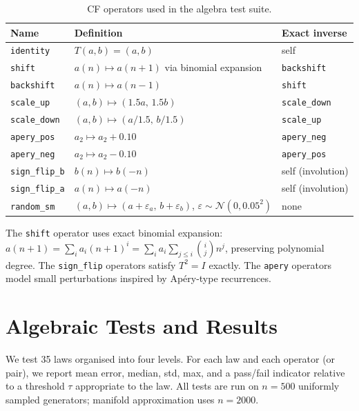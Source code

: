 \documentclass[11pt,a4paper]{article}
\begin{document}
\begin{table}[h]
\centering
\caption{CF operators used in the algebra test suite.}
\label{tab:operators}
\begin{tabular}{lll}
\toprule
Name & Definition & Exact inverse \\
\midrule
\texttt{identity}    & $T(a,b) = (a,b)$ & self \\
\texttt{shift}       & $a(n) \mapsto a(n+1)$ via binomial expansion & \texttt{backshift} \\
\texttt{backshift}   & $a(n) \mapsto a(n-1)$ & \texttt{shift} \\
\texttt{scale\_up}   & $(a,b) \mapsto (1.5a,\, 1.5b)$ & \texttt{scale\_down} \\
\texttt{scale\_down} & $(a,b) \mapsto (a/1.5,\, b/1.5)$ & \texttt{scale\_up} \\
\texttt{apery\_pos}  & $a_2 \mapsto a_2 + 0.10$ & \texttt{apery\_neg} \\
\texttt{apery\_neg}  & $a_2 \mapsto a_2 - 0.10$ & \texttt{apery\_pos} \\
\texttt{sign\_flip\_b} & $b(n) \mapsto b(-n)$ & self (involution) \\
\texttt{sign\_flip\_a} & $a(n) \mapsto a(-n)$ & self (involution) \\
\texttt{random\_sm}  & $(a,b) \mapsto (a + \varepsilon_a,\, b + \varepsilon_b)$,
                       $\varepsilon \sim \mathcal{N}(0, 0.05^2)$ & none \\
\bottomrule
\end{tabular}
\end{table}

The \texttt{shift} operator uses exact binomial expansion:
$a(n+1) = \sum_i a_i (n+1)^i = \sum_i a_i \sum_{j\leq i} \binom{i}{j} n^j$,
preserving polynomial degree.  The \texttt{sign\_flip} operators satisfy
$T^2 = I$ exactly.  The \texttt{apery} operators model small perturbations
inspired by Ap\'ery-type recurrences.

\section{Algebraic Tests and Results}
\label{sec:results}

We test 35 laws organised into four levels.  For each law and each operator
(or pair), we report mean error, median, std, max, and a pass/fail indicator
relative to a threshold $\tau$ appropriate to the law.  All tests are run on
$n = 500$ uniformly sampled generators; manifold approximation uses $n = 2000$.
\end{document}
